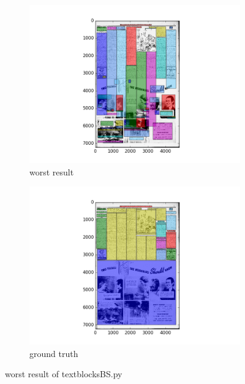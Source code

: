 \documentclass[a4paper,10pt]{article}
\begin{document}
					\begin{figure}
					\centering
					\begin{subfigure}{.5\textwidth}
					  \centering
					  \includegraphics[width=10cm]
					{textblocksBS.py.worst.png}
					  \caption{worst result}
					  \label{fig:sub1}
					\end{subfigure}%
					\begin{subfigure}{.5\textwidth}
					  \centering
					  \includegraphics[width=10cm]
					{textblocksBS.py.gt.worst.png}
					  \caption{ground truth}
					  \label{fig:sub2}
					\end{subfigure}
					\caption
					{worst result of textblocksBS.py}
					\label{fig:test}
					\end{figure}
						
\end{document}

